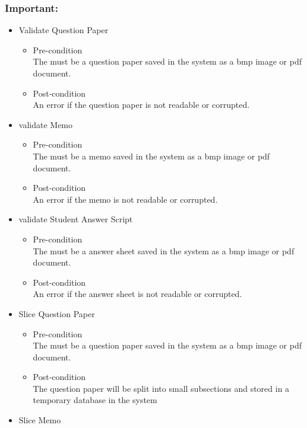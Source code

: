 \documentclass{article}
\begin{document}
\subsubsection{Important:}
	\begin{itemize}
		\item Validate Question Paper
			\begin{itemize}
				\item Pre-condition \\
					 The must be a question paper saved in the system as a bmp image or pdf document.
				\item Post-condition \\
					 An error if the question paper is not readable or corrupted.
			\end{itemize}
		\item validate Memo
			\begin{itemize}
				\item Pre-condition \\
					 The must be a memo saved in the system as a bmp image or pdf document.
				\item Post-condition \\
					 An error if the memo is not readable or corrupted.
			\end{itemize}
		\item validate Student Answer Script
			\begin{itemize}
				\item Pre-condition \\
					 The must be a answer sheet saved in the system as a bmp image or pdf document.
				\item Post-condition \\
					 An error if the answer sheet is not readable or corrupted.
			\end{itemize}
		\item Slice Question Paper
			\begin{itemize}
				\item Pre-condition  \\
					 The must be a question paper saved in the system as a bmp image or pdf document.
				\item Post-condition \\
					 The question paper will be split into small subsections and stored in a temporary database in the system
			\end{itemize}
		\item Slice Memo
			\begin{itemize}

\end{itemize}
\end{itemize}
\end{document}
